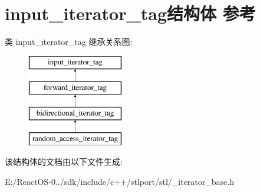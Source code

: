 \hypertarget{structinput__iterator__tag}{}\section{input\+\_\+iterator\+\_\+tag结构体 参考}
\label{structinput__iterator__tag}
类 input\+\_\+iterator\+\_\+tag 继承关系图\+:\begin{figure}[H]
\begin{center}
\leavevmode
\includegraphics[height=4.000000cm]{structinput__iterator__tag}
\end{center}
\end{figure}


该结构体的文档由以下文件生成\+:\begin{DoxyCompactItemize}
\item 
E\+:/\+React\+O\+S-\/0../sdk/include/c++/stlport/stl/\+\_\+iterator\+\_\+base.\+h\end{DoxyCompactItemize}
